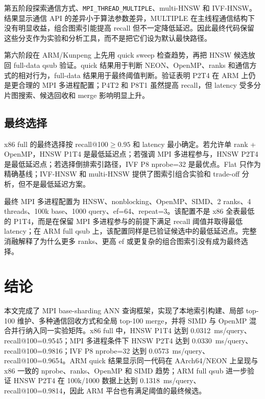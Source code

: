 \documentclass[11pt,a4paper]{article}
\newcommand{\msq}{ms/query}
\begin{document}
第五阶段探索通信方式、\texttt{MPI\_THREAD\_MULTIPLE}、multi-HNSW 和 IVF-HNSW。结果显示通信 API 的差异小于算法参数差异，MULTIPLE 在主线程通信结构下没有明显收益，组合图索引能提高 recall 但不一定降低延迟。因此最终代码保留这些分支作为实验和分析工具，而不是把它们设为默认最快路径。

第六阶段在 ARM/Kunpeng 上先用 quick sweep 检查趋势，再把 HNSW 候选放回 full-data qsub 验证。quick 结果用于判断 NEON、OpenMP、ranks 和通信方式的相对行为，full-data 结果用于最终阈值判断。验证表明 P2T4 在 ARM 上仍是更合理的 MPI 多进程配置；P4T2 和 P8T1 虽然提高 recall，但 latency 受多分片图搜索、候选回收和 merge 影响明显上升。

\subsection{最终选择}

x86 full 的最终选择按 recall@100$\ge0.95$ 和 latency 最小确定。若允许单 rank + OpenMP，HNSW P1T4 是最低延迟点；若强调 MPI 多进程参与，HNSW P2T4 是最低延迟点；若选择倒排索引路径，IVF P8 nprobe=32 是最优点。Flat 只作为精确基线；IVF-HNSW 和 multi-HNSW 提供了图索引组合实验和 trade-off 分析，但不是最低延迟方案。

最终 MPI 多进程配置为 HNSW、nonblocking、OpenMP、SIMD、2 ranks、4 threads、100k base、1000 query、ef=64、repeat=3。该配置不是 x86 全表最低的 P1T4，而是在保留 MPI 多进程参与的前提下满足 recall 阈值并取得最低 latency；在 ARM full qsub 上，该配置同样是已验证候选中的最低延迟点。完整消融解释了为什么更多 ranks、更高 ef 或更复杂的组合图索引没有成为最终选择。

\section{结论}

本文完成了 MPI base-sharding ANN 查询框架，实现了本地索引构建、局部 top-100 维护、多种通信回收方式和全局 top-100 merge，并将 SIMD 与 OpenMP 混合并行纳入同一实验矩阵。x86 full 中，HNSW P1T4 达到 0.0312~\msq、recall@100=0.9545；MPI 多进程条件下 HNSW P2T4 达到 0.0330~\msq、recall@100=0.9816；IVF P8 nprobe=32 达到 0.0573~\msq、recall@100=0.9654。ARM quick 结果显示同一代码在 AArch64/NEON 上呈现与 x86 一致的 nprobe、ranks、OpenMP 和 SIMD 趋势；ARM full qsub 进一步验证 HNSW P2T4 在 100k/1000 数据上达到 0.1318~\msq、recall@100=0.9814，因此 ARM 平台也有满足阈值的最终候选。
\end{document}
